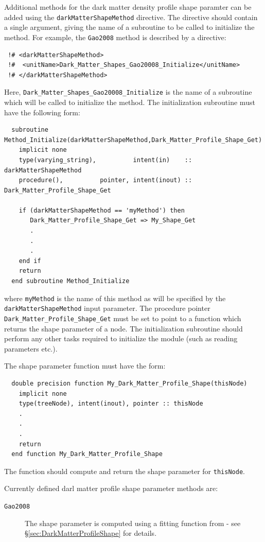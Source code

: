 Additional methods for the dark matter density profile shape paramter can be added using the {\tt darkMatterShapeMethod} directive. The directive should contain a single argument, giving the name of a subroutine to be called to initialize the method. For example, the {\tt Gao2008} method is described by a directive:
\begin{verbatim}
 !# <darkMatterShapeMethod>
 !#  <unitName>Dark_Matter_Shapes_Gao20008_Initialize</unitName>
 !# </darkMatterShapeMethod>
\end{verbatim}
Here, {\tt Dark\_Matter\_Shapes\_Gao20008\_Initialize} is the name of a subroutine which will be called to initialize the method. The initialization subroutine must have the following form:
\begin{verbatim}
  subroutine Method_Initialize(darkMatterShapeMethod,Dark_Matter_Profile_Shape_Get)
    implicit none
    type(varying_string),          intent(in)    :: darkMatterShapeMethod
    procedure(),          pointer, intent(inout) :: Dark_Matter_Profile_Shape_Get
    
    if (darkMatterShapeMethod == 'myMethod') then
       Dark_Matter_Profile_Shape_Get => My_Shape_Get
       .
       .
       .
    end if
    return
  end subroutine Method_Initialize
\end{verbatim}
where {\tt myMethod} is the name of this method as will be specified by the {\tt darkMatterShapeMethod} input parameter. The procedure pointer {\tt Dark\_Matter\_Profile\_Shape\_Get} must be set to point to a function which returns the shape parameter of a node. The initialization subroutine should perform any other tasks required to initialize the module (such as reading parameters etc.).

The shape parameter function must have the form:
\begin{verbatim}
  double precision function My_Dark_Matter_Profile_Shape(thisNode)
    implicit none
    type(treeNode), intent(inout), pointer :: thisNode
    .
    .
    .
    return
  end function My_Dark_Matter_Profile_Shape
\end{verbatim}
The function should compute and return the shape parameter for {\tt thisNode}.

Currently defined darl matter profile shape parameter methods are:
\begin{description}
 \item [{\tt Gao2008}] The shape parameter is computed using a fitting function from \cite{gao_redshift_2008} - see \S\ref{sec:DarkMatterProfileShape} for details.
\end{description}

